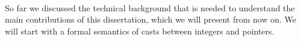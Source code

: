 %




\paragraph*{}

So far we discussed the technical background that is needed to understand the main contributions of
this dissertation, which we will present from now on.  We will start with a formal semantics of
casts between integers and pointers.


